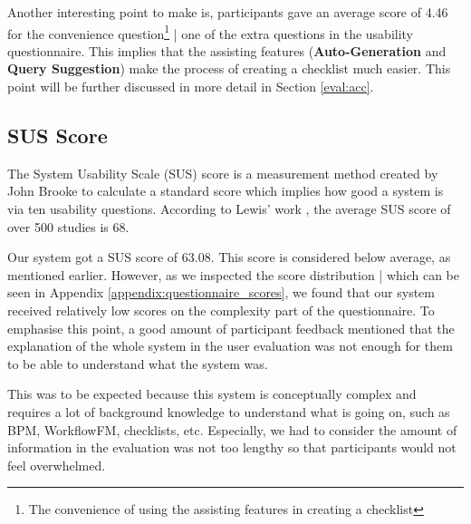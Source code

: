 Another interesting point to make is, participants gave an average score of 4.46 for the convenience question\footnote{The convenience of using the assisting features in creating a checklist} | one of the extra questions in the usability questionnaire. This implies that the assisting features (\textbf{Auto-Generation} and \textbf{Query Suggestion}) make the process of creating a checklist much easier. This point will be further discussed in more detail in Section \ref{eval:acc}.


\subsection{SUS Score}
\label{eval:sus_score}
The System Usability Scale (SUS) score is a measurement method created by John Brooke \cite{susscores} to calculate a standard score which implies how good a system is via ten usability questions. According to Lewis' work \cite{68avgsus}, the average SUS score of over 500 studies is 68.

Our system got a SUS score of 63.08. This score is considered below average, as mentioned earlier. However, as we inspected the score distribution | which can be seen in Appendix \ref{appendix:questionnaire_scores}, we found that our system received relatively low scores on the complexity part of the questionnaire. To emphasise this point, a good amount of participant feedback mentioned that the explanation of the whole system in the user evaluation was not enough for them to be able to understand what the system was.

This was to be expected because this system is conceptually complex and requires a lot of background knowledge to understand what is going on, such as BPM, WorkflowFM, checklists, etc. Especially, we had to consider the amount of information in the evaluation was not too lengthy so that participants would not feel overwhelmed.






